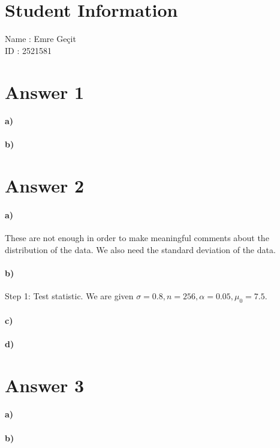 \documentclass[12pt]{article}
\begin{document}
\section*{Student Information}

Name : Emre Geçit\\

ID : 2521581\\


\section*{Answer 1}
\paragraph{a)}
\paragraph{b)}

\section*{Answer 2}
\paragraph{a)}
These are not enough in order to make meaningful comments about the distribution of the data. We also need the standard deviation of the data.
\paragraph{b)}
Step 1: Test statistic. We are given $\sigma = 0.8, n = 256, \alpha = 0.05, \mu_0 = 7.5$.
\paragraph{c)}
\paragraph{d)}

\section*{Answer 3}
\paragraph{a)}
\paragraph{b)}
\end{document}
